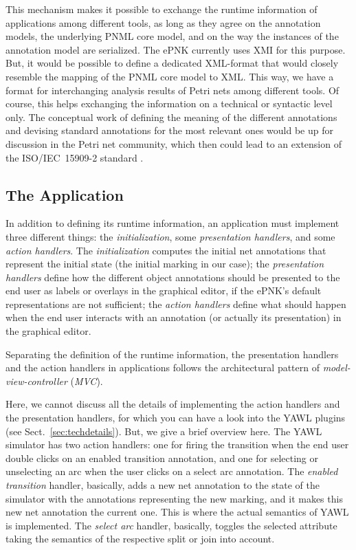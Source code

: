 \documentclass[a4paper]{llncs}
\begin{document}
This mechanism makes it possible to exchange the runtime information
of  applications among different tools, as long as they agree on the annotation
models, the underlying PNML core model, and on the way the instances of the annotation
model are serialized. The ePNK currently uses XMI \cite{XMI03} for this purpose.
But, it would be possible to define a dedicated XML-format that
would closely resemble the mapping of the PNML core model to XML. This way,
we have a format for interchanging analysis results of Petri nets among
different tools. Of course, this helps exchanging the information on a technical
or syntactic level only. The conceptual work of 
defining the meaning of the different annotations and devising
standard annotations for the most relevant ones would be up for
discussion in the Petri net community, which then could lead to
an extension of the ISO/IEC~15909-2 standard
\cite{ISO-IEC:15909-2-2011}.

\subsection{The Application}
\label{subsec:yawl-appl}

In addition to defining its runtime information, an application must
implement three different things: the \emph{initialization}, some
\emph{presentation handlers}, and some \emph{action handlers}.
The \emph{initialization} computes the initial net annotations that
represent the initial state (the initial marking in our case); 
the \emph{presentation handlers} define how the different
object annotations should be presented to the end user as labels or overlays
in the graphical editor, if the ePNK's default representations are not sufficient;
the \emph{action handlers} define what should happen when the end user interacts
with an annotation (or actually its presentation) in the graphical editor.

Separating the definition of the runtime information, the presentation
handlers and the action handlers in applications follows the architectural
pattern of \emph{model-view-controller} (\emph{MVC}).

Here, we cannot discuss all the details of implementing the action handlers
and the presentation handlers, for which you can have a look into the YAWL plugins
(see Sect.~\ref{sec:techdetails}). But, we give a brief overview here. The YAWL simulator
has two action handlers: one for firing the transition when the end user double clicks on
an enabled transition annotation, and one for selecting or unselecting
an arc when the user clicks on a select arc annotation. The \emph{enabled transition}
handler, basically, adds a new net annotation to the state of the simulator with the
annotations representing the new marking, and it makes this new net annotation the
current one. This is where the actual semantics of YAWL is implemented.
The \emph{select arc} handler, basically, toggles the {\sf selected}
attribute taking the semantics of the respective split or join into account.
\end{document}

